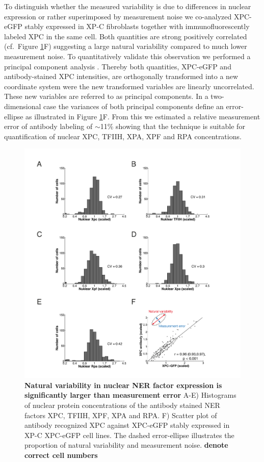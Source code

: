 To distinguish whether the measured variability is due to differences in nuclear expression or rather superimposed by measurement noise we co-analyzed XPC-eGFP stably expressed in XP-C fibroblasts together with immunofluorescently labeled XPC in the same cell. Both quantities are strong positively correlated (cf.\ Figure \ref{fig:ProteinDist}F) suggesting a large natural variability compared to much lower measurement noise. To quantitatively validate this observation we performed a principal component analysis \cite{Pearson1901}. Thereby both quantities, XPC-eGFP and antibody-stained XPC intensities, are orthogonally transformed into a new coordinate system were the new transformed variables are linearly uncorrelated. These new variables are referred to as principal components. In a two-dimensional case the variances of both principal components define an error-ellipse as illustrated in Figure \ref{fig:ProteinDist}F. From this we estimated a relative measurement error of antibody labeling of $\sim$11\% showing that the technique is suitable for quantification of nuclear XPC, TFIIH, XPA, XPF and RPA concentrations.       

\begin{figure}[htbp]
	\begin{center}
		\includegraphics[width=1\textwidth]{Abbildungen/figure3_2.pdf}
		\caption{\textbf{Natural variability in nuclear NER factor expression is significantly larger than measurement error} A-E) Histograms of nuclear protein concentrations of the antibody stained NER factors XPC, TFIIH, XPF, XPA and RPA. F) Scatter plot of antibody recognized XPC against XPC-eGFP stably expressed in XP-C XPC-eGFP cell lines. The dashed error-ellipse illustrates the proportion of natural variability and measurement noise. \textbf{denote correct cell numbers}}
		\label{fig:ProteinDist}
	\end{center}
\end{figure}

